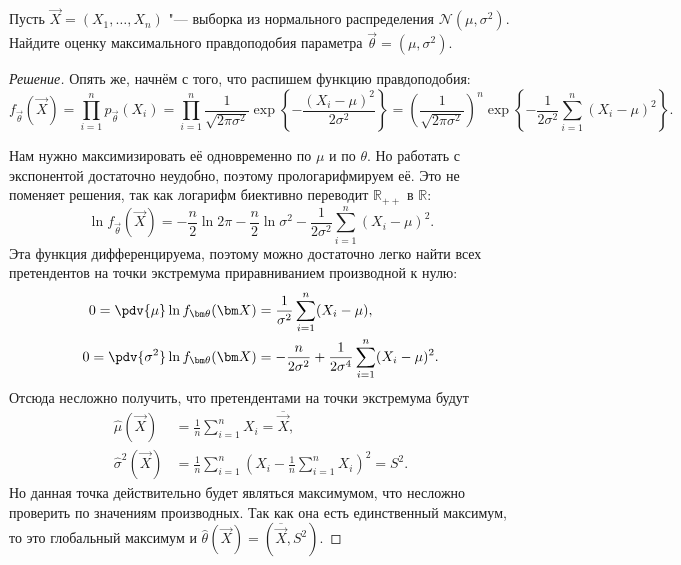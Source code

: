 \begin{problem}
    Пусть $\vec{X} = (X_{1}, \ldots, X_{n})$ "--- выборка из нормального распределения $\mathcal{N}(\mu, \sigma^{2})$. Найдите оценку максимального правдоподобия параметра $\vec{\theta} = (\mu, \sigma^{2})$.
\end{problem}
\begin{proof}[Решение]
    Опять же, начнём с того, что распишем функцию правдоподобия:
    \[
        f_{\vec{\theta}}(\vec{X}) 
        = \prod_{i = 1}^{n} p_{\vec{\theta}}(X_{i}) 
        = \prod_{i = 1}^{n} \frac{1}{\sqrt{2\pi\sigma^{2}}}\exp\left\{-\frac{(X_{i} - \mu)^{2}}{2\sigma^{2}}\right\}
        = \left(\frac{1}{\sqrt{2\pi\sigma^{2}}}\right)^{n} \exp\left\{-\frac{1}{2\sigma^{2}} \sum_{i = 1}^{n} (X_{i} - \mu)^{2}\right\}.
    \]
    
    Нам нужно максимизировать её одновременно по $\mu$ и по $\theta$. Но работать с экспонентой достаточно неудобно, поэтому прологарифмируем её. Это не поменяет решения, так как логарифм биективно переводит $\mathbb{R}_{++}$ в $\mathbb{R}$:
    \[
        \ln f_{\vec{\theta}}(\vec{X})
        = -\frac{n}{2}\ln 2\pi - \frac{n}{2}\ln \sigma^{2} - \frac{1}{2\sigma^{2}} \sum_{i = 1}^{n} (X_{i} - \mu)^{2}.
    \]
    Эта функция дифференцируема, поэтому можно достаточно легко найти всех претендентов на точки экстремума приравниванием производной к нулю:
    \begin{align*}
        0 = \pdv{\mu} \ln f_{\vec{\theta}}(\vec{X})
        &= \frac{1}{\sigma^{2}}\sum_{i = 1}^{n} (X_{i} - \mu), \\
        0 = \pdv{\sigma^{2}} \ln f_{\vec{\theta}}(\vec{X})
        &= -\frac{n}{2\sigma^{2}} + \frac{1}{2\sigma^{4}}\sum_{i = 1}^{n} (X_{i} - \mu)^{2}.
    \end{align*}
    Отсюда несложно получить, что претендентами на точки экстремума будут 
    \begin{align*}
        \hat{\mu}(\vec{X}) 
        &= \frac{1}{n}\sum_{i = 1}^{n} X_{i} = \overline{\vec{X}}, \\
        \hat{\sigma}^{2}(\vec{X})
        &= \frac{1}{n}\sum_{i = 1}^{n} \left(X_{i} - \frac{1}{n}\sum_{i = 1}^{n} X_{i}\right)^{2} = S^{2}.
    \end{align*}
    Но данная точка действительно будет являться максимумом, что несложно проверить по значениям производных. Так как она есть единственный максимум, то это глобальный максимум и $\hat{\theta}(\vec{X}) = (\overline{\vec{X}}, S^{2})$.
\end{proof}


